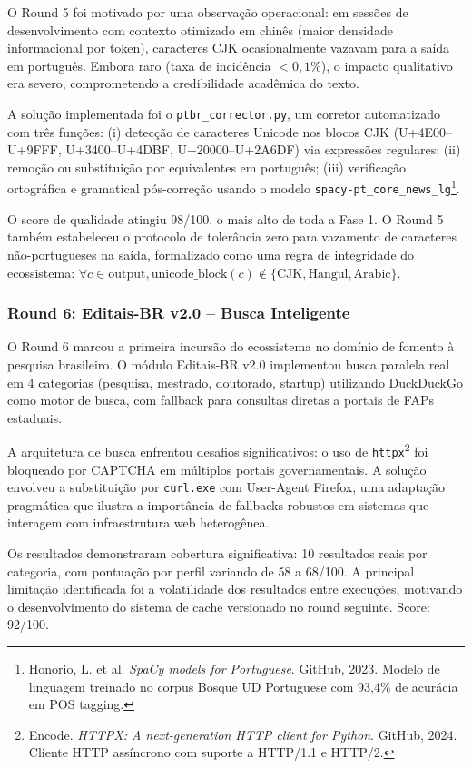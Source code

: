 O Round 5 foi motivado por uma observação operacional: em sessões de
desenvolvimento com contexto otimizado em chinês (maior densidade
informacional por token), caracteres CJK ocasionalmente vazavam para a
saída em português. Embora raro (taxa de incidência $< 0{,}1\%$), o
impacto qualitativo era severo, comprometendo a credibilidade acadêmica do
texto.

A solução implementada foi o \texttt{ptbr\_corrector.py}, um corretor
automatizado com três funções: (i) detecção de caracteres Unicode nos
blocos CJK (U+4E00--U+9FFF, U+3400--U+4DBF, U+20000--U+2A6DF) via
expressões regulares; (ii) remoção ou substituição por equivalentes em
português; (iii) verificação ortográfica e gramatical pós-correção usando
o modelo \texttt{spacy-pt\_core\_news\_lg}\footnote{Honorio, L. et al.
\textit{SpaCy models for Portuguese}. GitHub, 2023. Modelo de linguagem
treinado no corpus Bosque UD Portuguese com 93,4\% de acurácia em POS
tagging.}.

O score de qualidade atingiu 98/100, o mais alto de toda a Fase 1. O
Round 5 também estabeleceu o protocolo de tolerância zero para vazamento
de caracteres não-portugueses na saída, formalizado como uma regra de
integridade do ecossistema: $\forall c \in \text{output},
\text{unicode\_block}(c) \notin \{\text{CJK}, \text{Hangul},
\text{Arabic}\}$.

\subsubsection{Round 6: Editais-BR v2.0 -- Busca Inteligente}

O Round 6 marcou a primeira incursão do ecossistema no domínio de
fomento à pesquisa brasileiro. O módulo Editais-BR v2.0 implementou
busca paralela real em 4 categorias (pesquisa, mestrado, doutorado,
startup) utilizando DuckDuckGo como motor de busca, com fallback para
consultas diretas a portais de FAPs estaduais.

A arquitetura de busca enfrentou desafios significativos: o uso de
\texttt{httpx}\footnote{Encode. \textit{HTTPX: A next-generation HTTP
client for Python}. GitHub, 2024. Cliente HTTP assíncrono com suporte a
HTTP/1.1 e HTTP/2.} foi bloqueado por CAPTCHA em múltiplos portais
governamentais. A solução envolveu a substituição por \texttt{curl.exe}
com User-Agent Firefox, uma adaptação pragmática que ilustra a
importância de fallbacks robustos em sistemas que interagem com
infraestrutura web heterogênea.

Os resultados demonstraram cobertura significativa: 10 resultados reais
por categoria, com pontuação por perfil variando de 58 a 68/100. A
principal limitação identificada foi a volatilidade dos resultados entre
execuções, motivando o desenvolvimento do sistema de cache versionado no
round seguinte. Score: 92/100.

